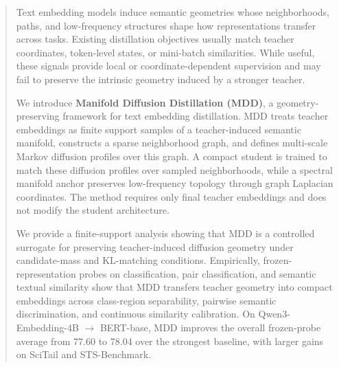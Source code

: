\begin{abstract}

Text embedding models induce semantic geometries whose neighborhoods, paths, and low-frequency structures shape how representations transfer across tasks. Existing distillation objectives usually match teacher coordinates, token-level states, or mini-batch similarities. While useful, these signals provide local or coordinate-dependent supervision and may fail to preserve the intrinsic geometry induced by a stronger teacher.

We introduce \textbf{Manifold Diffusion Distillation (MDD)}, a geometry-preserving framework for text embedding distillation. MDD treats teacher embeddings as finite support samples of a teacher-induced semantic manifold, constructs a sparse neighborhood graph, and defines multi-scale Markov diffusion profiles over this graph. A compact student is trained to match these diffusion profiles over sampled neighborhoods, while a spectral manifold anchor preserves low-frequency topology through graph Laplacian coordinates. The method requires only final teacher embeddings and does not modify the student architecture.

We provide a finite-support analysis showing that MDD is a controlled surrogate for preserving teacher-induced diffusion geometry under candidate-mass and KL-matching conditions. Empirically, frozen-representation probes on classification, pair classification, and semantic textual similarity show that MDD transfers teacher geometry into compact embeddings across class-region separability, pairwise semantic discrimination, and continuous similarity calibration. On Qwen3-Embedding-4B $\rightarrow$ BERT-base, MDD improves the overall frozen-probe average from 77.60 to 78.04 over the strongest baseline, with larger gains on SciTail and STS-Benchmark.

\end{abstract}
